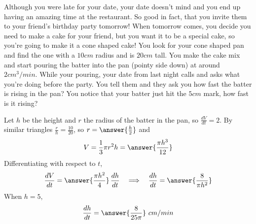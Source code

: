 \documentclass{ximera}
\begin{document}
\begin{example}\label{example:8-8}
Although you were late for your date, your date doesn't mind and you end up having an amazing time at the restaurant. So good in fact, that you invite them to your friend's birthday party tomorrow! When tomorrow comes, you decide you need to make a cake for your friend, but you want it to be a special cake, so you're going to make it a cone shaped cake! You look for your cone shaped pan and find the one with a $10 cm$ radius and is $20 cm$ tall. You make the cake mix and start pouring the batter into the pan (pointy side down) at around $2 cm^{3} / min$. While your pouring, your date from last night calls and asks what you're doing before the party. You tell them and they ask you how fast the batter is rising in the pan? You notice that your batter just hit the $5 cm$ mark, how fast is it rising?

Let $h$ be the height and $r$ the radius of the batter in the pan, so $\frac{dV}{dt}=2$. By similar triangles $\frac{r}{h}=\frac{10}{20}$, so $r=\answer{\frac{h}{2}}$ and
\[
V=\frac{1}{3}\pi r^{2}h=\answer{\frac{\pi h^{3}}{12}}
\]
Differentiating with respect to $t$,
\[
\frac{dV}{dt}=\answer{\frac{\pi h^{2}}{4}}\,\frac{dh}{dt}
\quad\Longrightarrow\quad
\frac{dh}{dt}=\answer{\frac{8}{\pi h^{2}}}
\]
When $h=5$,
\[
\frac{dh}{dt}=\answer{\frac{8}{25\pi}}\ cm/min
\]
\end{example}
\end{document}

